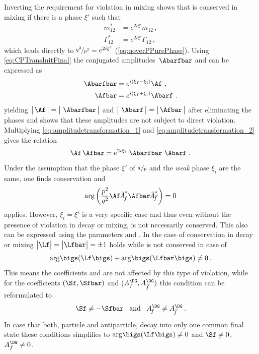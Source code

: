 Inverting the requirement for \CP violation in mixing shows that \CP is conserved in mixing if there is a phase $\xi'$ such that
\begin{equation}
\begin{split}
m_{12}^\ast &= e^{2i\xi'}m_{12}\,,\\
\Gamma_{12}^\ast &= e^{2i\xi'}\Gamma_{12}\,,\label{eq:CPconservationMixing}
\end{split}
\end{equation}
which leads directly to $\nicefrac{q^2}{p^2} = e^{2i\xi'}$ (\cref{eq:qoverPPurePhase}).
Using \cref{eq:CPTransInitFinal} the \CP conjugated amplitudes $\,\Abarfbar$ and \Afbar can be expressed as
\begin{align}
\Abarfbar&=e^{i\left(\xi_f-\xi_i\right)}\Af\,\,,\label{eq:amplitudetransformation_1}\\
\Afbar&=e^{i\left(\xi_f+\xi_i\right)}\Abarf\,\,.\label{eq:amplitudetransformation_2}
\end{align}
yielding $\big|\,\Af\,\big|=\big|\,\,\Abarfbar\,\big|$ and $\big|\,\,\Abarf\,\big|=\big|\,\Afbar\,\big|$ after eliminating the phases and shows that these amplitudes are not subject to direct \CP violation.
Multiplying \cref{eq:amplitudetransformation_1} and \cref{eq:amplitudetransformation_2} gives the relation
\begin{equation}
\Af\,\Afbar=e^{2i\xi_i}\,\,\Abarfbar\,\,\Abarf\,\,.
\end{equation}
Under the assumption that the phase $\xi'$ of $\nicefrac{q\,}{p}$ and the \emph{weak} phase $\xi_i$ are the same, one finds \CP conservation and
\begin{equation}
\arg\left(\frac{p^2}{q^2}\Af \,\overline{\kern -2.5pt A\kern -1.0pt}_{\kern -0.5pt f}^{\kern 0.7pt \ast}\Afbar\,\overline{\kern -2.5pt A\kern -1.0pt}_{\kern 2.0pt\overline{\kern -2.5pt f\kern 1pt}}^{\kern 0.7pt \ast}\right)=0
\end{equation}
applies.
However, $\xi_i=\xi'$ is a very specific case and thus even without the presence of \CP violation in decay or mixing, \CP is not necessarily conserved.
This also can be expressed using the parameters \Lf and \Lfbar.
In the case of \CP conservation in decay or mixing $\big|\Lf\big|=\big|\Lfbar\big| = \pm1$ holds while \CP is not conserved in case of
\begin{equation}
	\arg\!\bigs(\Lf\bigs)+\arg\!\bigs(\Lfbar\bigs)\neq0\,. \label{eq:conditionCPV}
\end{equation}
This means the \CP coefficients \Cf and \Cfbar are not affected by this type of \CP violation, while for the coefficients $(\Sf, \Sfbar)$ and  ($A_f^{\DG}, A_{\kern 1.5pt\overline{\kern -1.5pt f\kern 1.5pt}}^{\DG})$ this condition can be reformulated to
\begin{equation}
\Sf\neq-\Sfbar\,\,\,\,\,\text{and}\,\,\,\,\,A_{\kern -1.5pt f}^{\DG}\neq A_{\kern 1.0pt\overline{\kern -2.5pt f\kern 1.0pt}}^{\DG}\,.\label{eq:condForIntCPV}
\end{equation}
In case that both, particle and antiparticle, decay into only one common final state these conditions simplifies to $\arg\!\bigs(\Lf\bigs)\neq0$ and $\Sf\neq0$, $A_f^{\DG}\neq0$.


